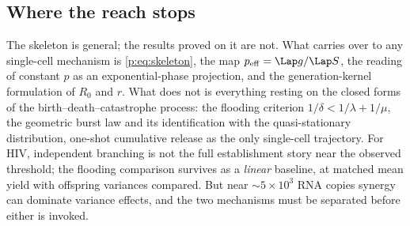 \subsection{Where the reach stops}

The skeleton is general; the results proved on it are not. What carries over
to any single-cell mechanism is \cref{p:eq:skeleton}, the map
$p_{\rm eff}=\Lap g/\Lap S$, the reading of constant $p$ as an
exponential-phase projection, and the generation-kernel formulation of $R_0$
and $r$. What does not is everything resting on the closed forms of the
birth--death--catastrophe process: the flooding criterion
$1/\delta<1/\lambda+1/\mu$, the geometric burst law and its identification
with the quasi-stationary distribution, one-shot cumulative release as the
only single-cell trajectory. For HIV, independent branching is not the full
establishment story near the observed threshold; the flooding comparison
survives as a \emph{linear} baseline, at matched mean yield with offspring
variances compared. But near $\sim5\times10^3$ RNA copies synergy can
dominate variance effects, and the two mechanisms must be separated before
either is invoked.

\FloatBarrier
